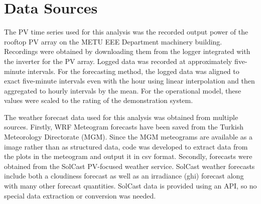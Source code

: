 \section{Data Sources}
\label{sec:data-source}

The PV time series used for this analysis was the recorded output power of the rooftop PV array on the METU EEE Department machinery building.
Recordings were obtained by downloading them from the logger integrated with the inverter for the PV array.
Logged data was recorded at approximately five-minute intervals.
For the forecasting method, the logged data was aligned to exact five-minute intervals even with the hour using linear interpolation and then aggregated to hourly intervals by the mean.
For the operational model, these values were scaled to the rating of the demonstration system.


The weather forecast data used for this analysis was obtained from multiple sources.
Firstly, WRF Meteogram forecasts have been saved from the Turkish Meteorology Directorate (MGM)\cite{MGM_Meteogram}.
Since the MGM meteograms are available as a image rather than as structured data, code was developed to extract data from the plots in the meteogram and output it in csv format\cite{MeteogramExtractGithubRepo}.
Secondly, forecasts were obtained from the SolCast PV-focused weather service\cite{Solcast}.
SolCast weather forecasts include both a cloudiness forecast as well as an irradiance (ghi) forecast along with many other forecast quantities.
SolCast data is provided using an API, so no special data extraction or conversion was needed.

